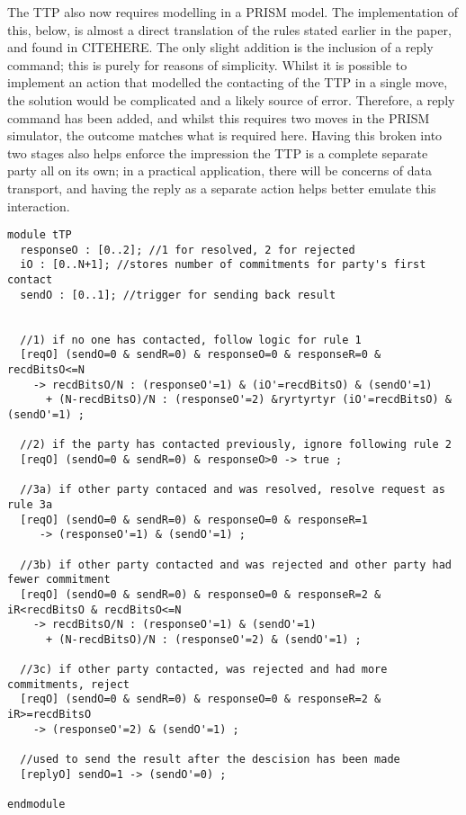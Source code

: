 \documentclass{l4proj}
\begin{document}
The TTP also now requires modelling in a PRISM model. The implementation of this, below, is almost a direct translation of the rules stated earlier in the paper, and found in CITEHERE. The only slight addition is the inclusion of a reply command; this is purely for reasons of simplicity. Whilst it is possible to implement an action that modelled the contacting of the TTP in a single move, the solution would be complicated and a likely source of error. Therefore, a reply command has been added, and whilst this requires two moves in the PRISM simulator, the outcome matches what is required here. Having this broken into two stages also helps enforce the impression the TTP is a complete separate party all on its own; in a practical application, there will be concerns of data transport, and having the reply as a separate action helps better emulate this interaction.
\begin{minipage}{\linewidth}
\begin{lstlisting}
module tTP
  responseO : [0..2]; //1 for resolved, 2 for rejected
  iO : [0..N+1]; //stores number of commitments for party's first contact
  sendO : [0..1]; //trigger for sending back result

        
  //1) if no one has contacted, follow logic for rule 1
  [reqO] (sendO=0 & sendR=0) & responseO=0 & responseR=0 & recdBitsO<=N 
    -> recdBitsO/N : (responseO'=1) & (iO'=recdBitsO) & (sendO'=1)  
      + (N-recdBitsO)/N : (responseO'=2) &ryrtyrtyr (iO'=recdBitsO) & (sendO'=1) ;

  //2) if the party has contacted previously, ignore following rule 2
  [reqO] (sendO=0 & sendR=0) & responseO>0 -> true ;
    
  //3a) if other party contaced and was resolved, resolve request as rule 3a
  [reqO] (sendO=0 & sendR=0) & responseO=0 & responseR=1 
     -> (responseO'=1) & (sendO'=1) ;

  //3b) if other party contacted and was rejected and other party had fewer commitment
  [reqO] (sendO=0 & sendR=0) & responseO=0 & responseR=2 & iR<recdBitsO & recdBitsO<=N 
    -> recdBitsO/N : (responseO'=1) & (sendO'=1) 
      + (N-recdBitsO)/N : (responseO'=2) & (sendO'=1) ;

  //3c) if other party contacted, was rejected and had more commitments, reject
  [reqO] (sendO=0 & sendR=0) & responseO=0 & responseR=2 & iR>=recdBitsO 
    -> (responseO'=2) & (sendO'=1) ;

  //used to send the result after the descision has been made
  [replyO] sendO=1 -> (sendO'=0) ;

endmodule

\end{lstlisting}
\end{minipage}
\end{document}
